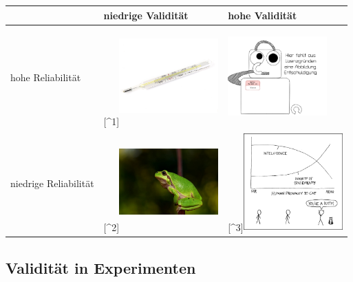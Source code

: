 \documentclass[
]{book}
\begin{document}
\begin{table}[H]
\centering
\begin{tabular}[t]{l>{}l>{}l}
\toprule
  & niedrige Validität & hohe Validität\\
\midrule
hohe Reliabilität & [\textasciicircum{}1]\includegraphics[width=1.5in, height=1.5in]{imgs/thermo.jpg} & \includegraphics[width=1.5in, height=1.5in]{imgs/copyright.png}\\
niedrige Reliabilität & [\textasciicircum{}2]\includegraphics[width=1.5in, height=1.5in]{imgs/frog.jpg} & [\textasciicircum{}3]\includegraphics[width=1.5in, height=1.5in]{imgs/kitty.png}\\
\bottomrule
\end{tabular}
\end{table}

\hypertarget{validituxe4t-in-experimenten}{%
\subsection{Validität in Experimenten}\label{validituxe4t-in-experimenten}}
\end{document}
